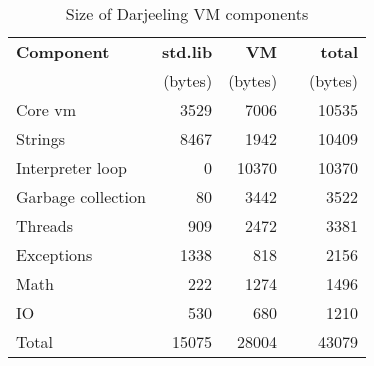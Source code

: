\begin{table}
\caption{Size of Darjeeling VM components}
\label{tab-vm-size}
    \begin{tabular}{lrrcr} %
    \toprule
    \bfseries Component   & \bfseries std.lib & \bfseries VM & & \bfseries total \\
                          & (bytes)                   & (bytes)              & & (bytes)  \\
    \midrule
    \midrule
    Core vm               &  3529                     &  7006                & &           10535 \\
    Strings               &  8467                     &  1942                & &           10409 \\
    Interpreter loop      &     0                     & 10370                & &           10370 \\
    Garbage collection    &    80                     &  3442                & &            3522 \\
    Threads               &   909                     &  2472                & &            3381 \\
    Exceptions            &  1338                     &   818                & &            2156 \\
    Math                  &   222                     &  1274                & &            1496 \\
    IO                    &   530                     &   680                & &            1210 \\
    Total                 & 15075                     & 28004                & &           43079 \\
    \bottomrule
    \end{tabular}
\end{table}
